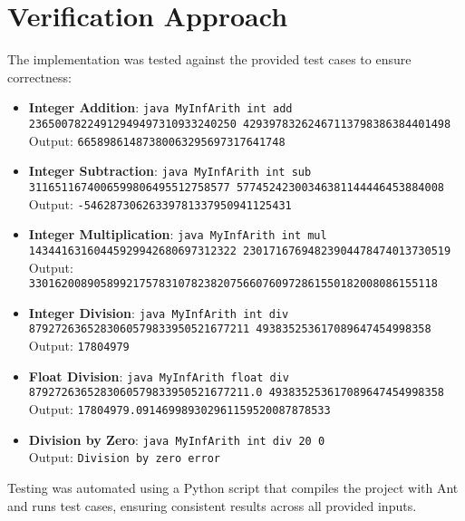 \documentclass[12pt]{article}
\begin{document}
\section{Verification Approach}
The implementation was tested against the provided test cases to ensure correctness:

\begin{itemize}
    \item \textbf{Integer Addition}: \texttt{java MyInfArith int add 23650078224912949497310933240250 42939783262467113798386384401498} \\ Output: \texttt{66589861487380063295697317641748}
    \item \textbf{Integer Subtraction}: \texttt{java MyInfArith int sub 3116511674006599806495512758577 57745242300346381144446453884008} \\ Output: \texttt{-54628730626339781337950941125431}
    \item \textbf{Integer Multiplication}: \texttt{java MyInfArith int mul 14344163160445929942680697312322 23017167694823904478474013730519} \\ Output: \texttt{330162008905899217578310782382075660760972861550182008086155118}
    \item \textbf{Integer Division}: \texttt{java MyInfArith int div 8792726365283060579833950521677211 493835253617089647454998358} \\ Output: \texttt{17804979}
    \item \textbf{Float Division}: \texttt{java MyInfArith float div 8792726365283060579833950521677211.0 493835253617089647454998358} \\ Output: \texttt{17804979.091469989302961159520087878533}
    \item \textbf{Division by Zero}: \texttt{java MyInfArith int div 20 0} \\ Output: \texttt{Division by zero error}
\end{itemize}

Testing was automated using a Python script that compiles the project with Ant and runs test cases, ensuring consistent results across all provided inputs.
\end{document}
